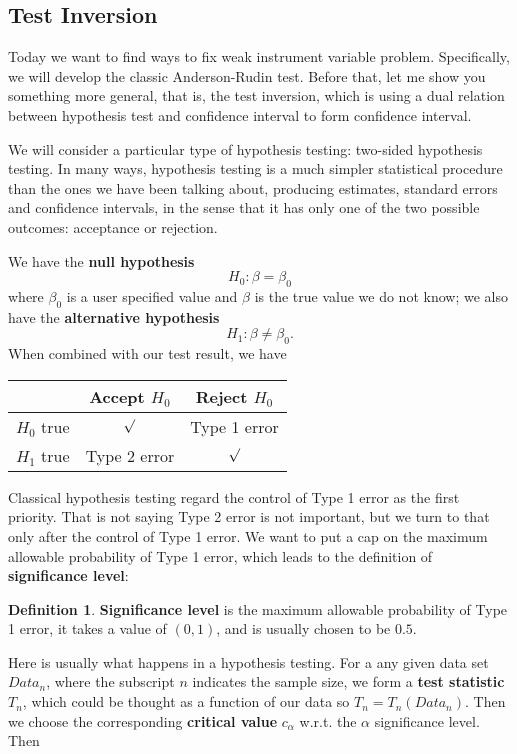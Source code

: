 \documentclass[11pt,a4paper]{amsart}
\theoremstyle{plain}
\theoremstyle{definition}
\newtheorem{definition}{Definition}
\begin{document}
\subsection{Test Inversion}
	Today we want to find ways to fix weak instrument variable problem. Specifically, we will develop the classic Anderson-Rudin test. Before that, let me show you something more general, that is, the test inversion, which is using a dual relation between hypothesis test and confidence interval to form confidence interval. \par 
	We will consider a particular type of hypothesis testing: two-sided hypothesis testing. In many ways, hypothesis testing is a much simpler statistical procedure than the ones we have been talking about, producing estimates, standard errors and confidence intervals, in the sense that it has only one of the two possible outcomes: acceptance or rejection. \par 
	We have the \textbf{null hypothesis}
	\[	H_{0} : \beta = \beta_{0}	\]
	where $\beta_{0}$ is a user specified value and $\beta$ is the true value we do not know; we also have the \textbf{alternative hypothesis}
	\[	H_{1} : \beta \ne \beta_{0}.	\]
	When combined with our test result, we have 
	\begin{table}[H]
		\centering 
		\begin{tabular}{ | l | c | c | } 
			\hline 
				& Accept $H_{0}$ & Reject $H_{0}$  \\ \hline 
			$H_{0}$ true & $\surd$ & Type 1 error \\ \hline 
			$H_{1}$ true & Type 2 error & $\surd$ \\ \hline 
		\end{tabular} 
	\end{table}
	Classical hypothesis testing regard the control of Type 1 error as the first priority. That is not saying Type 2 error is not important, but we turn to that only after the control of Type 1 error. We want to put a cap on the maximum allowable probability of Type 1 error, which leads to the definition of \textbf{significance level}:
	\begin{definition}
		\textbf{Significance level} is the maximum allowable probability of Type 1 error, it takes a value of $(0,1)$, and is usually chosen to be $0.5$. 
	\end{definition} 
	Here is usually what happens in a hypothesis testing. For a any given data set $Data_{n}$, where the subscript $n$ indicates the sample size, we form a \textbf{test statistic} $T_{n}$, which could be thought as a function of our data so $T_{n} = T_{n}(Data_{n})$. Then we choose the corresponding \textbf{critical value} $c_{\alpha}$ w.r.t. the $\alpha$ significance level. Then
\end{document}
